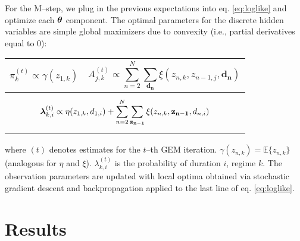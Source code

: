 \documentclass[runningheads]{llncs}
\begin{document}
For the M--step, we plug in the previous expectations into eq. \eqref{eq:loglike} and optimize each $\text{\boldmath$\theta$\unboldmath}$ component. The optimal parameters for the discrete hidden variables are simple global maximizers due to convexity  (i.e., partial derivatives equal to 0):
\begin{table*}[!]
	\centering
\begin{tabular}{|c |c|}
		\hline
		\parbox{4cm}{\begin{equation}
				\pi_k^{(t)} \propto \gamma(z_{1,k})
			\end{equation}}&
		\parbox[][1.05cm][t]{8cm}{\begin{equation}
				A_{j,k}^{(t)} \propto \sum_{n=2}^{N} \sum_{\mathbf{d_{n}}} \xi(z_{n,k}, z_{n-1,j} ,\mathbf{d_{n}})
		\end{equation}}\\
		\hline
		\\
		\hline
	\end{tabular}
\end{table*}


where $(t)$ denotes estimates for the $t$--th GEM iteration. $\gamma(z_{n,k})=\mathbb{E}\{z_{n,k}\}$ (analogous for $\eta$ and $\xi$). \boldmath$\lambda$\unboldmath$_{k,i}^{(t)}$ is the probability of duration $i$, regime $k$. The observation parameters are updated with local optima obtained via stochastic gradient descent and backpropagation applied to the last line of eq. \eqref{eq:loglike}. 

\section{Results}
\label{sec:results}
\end{document}

